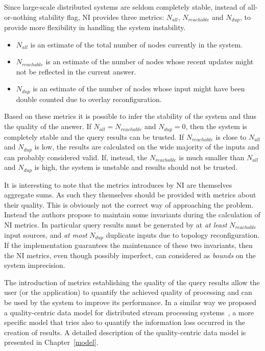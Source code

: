 Since large-scale distributed systems are seldom completely stable, instead of all-or-nothing stability flag, NI provides three 
metrics: $N_{all}$, $N_{reachable}$ and $N_{dup}$, to provide more flexibility in handling the system instability.
\begin{itemize}
	\item $N_{all}$ is an estimate of the total number of nodes currently in the system.
	\item $N_{reachable}$ is an estimate of the number of nodes whose recent updates might not be reflected in the
current answer.
	\item $N_{dup}$ is an estimate of the number of nodes whose input might have been double counted due to overlay
reconfiguration.
\end{itemize}
Based on these metrics it is possible to infer the stability of the system and thus the quality of the answer. If
$N_{all} = N_{reachable}$ and $N_{dup} = 0$, then the system is completely stable and the query results can be trusted. 
If $N_{reachable}$ is close to $N_{all}$ and $N_{dup}$ is low, the results are calculated on the wide majority of the
inputs and can probably considered valid. If, instead, the $N_{reachable}$ is much smaller than $N_{all}$ and $N_{dup}$
is high, the system is unstable and results should not be trusted.

It is interesting to note that the metrics introduces by NI are themselves aggregate sums. As such they themselves
should be provided with metrics about their quality. This is obviously not the correct way of approaching the problem.
Instead the authors propose to maintain some invariants during the calculation of NI metrics. In particular query
results must be generated by at \emph{at least} $N_{reachable}$ input sources, and \emph{at most} $N_{dup}$ duplicate
inputs due to topology reconfiguration. If the implementation guarantees the maintenance of these two invariants, then
the NI metrics, even though possibly imperfect, can considered as \emph{bounds} on the system imprecision.

The introduction of metrics establishing the quality of the query results allow the user (or the application) to
quantify the achieved quality of processing and can be used by the system to improve its performance. In a similar way we
proposed a quality-centric data model for distributed stream processing systems~\cite{dissp-qbd09}, a more specific
model that tries also to quantify the information loss occurred in the creation of results. A detailed description of the
quality-centric data model is presented in Chapter~\ref{model}. 
